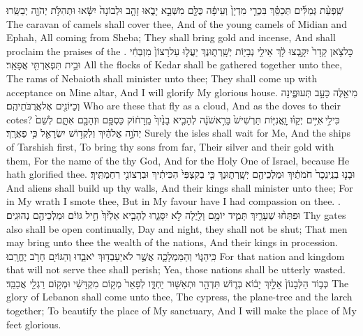 {שִֽׁפְעַ֨ת גְּמַלִּ֜ים תְּכַסֵּ֗ךְ בִּכְרֵ֤י מִדְיָן֙ וְעֵיפָ֔ה כֻּלָּ֖ם מִשְּׁבָ֣א יָבֹ֑אוּ זָהָ֤ב וּלְבוֹנָה֙ יִשָּׂ֔אוּ וּתְהִלֹּ֥ת יְהֹוָ֖ה יְבַשֵּֽׂרוּ׃}
{The caravan of camels shall cover thee, And of the young camels of Midian and Ephah, All coming from Sheba; They shall bring gold and incense, And shall proclaim the praises of the \lord.}
{כׇּל\maqqaf צֹ֤אן קֵדָר֙ יִקָּ֣בְצוּ לָ֔ךְ אֵילֵ֥י נְבָי֖וֹת יְשָֽׁרְת֑וּנֶךְ יַעֲל֤וּ עַל\maqqaf רָצוֹן֙ מִזְבְּחִ֔י וּבֵ֥ית תִּפְאַרְתִּ֖י אֲפָאֵֽר׃}
{All the flocks of Kedar shall be gathered together unto thee, The rams of Nebaioth shall minister unto thee; They shall come up with acceptance on Mine altar, And I will glorify My glorious house.}
{מִי\maqqaf אֵ֖לֶּה כָּעָ֣ב תְּעוּפֶ֑ינָה וְכַיּוֹנִ֖ים אֶל\maqqaf אֲרֻבֹּתֵיהֶֽם׃}
{Who are these that fly as a cloud, And as the doves to their cotes?}
{כִּי\maqqaf לִ֣י \legarmeh  אִיִּ֣ים יְקַוּ֗וּ וׇֽאֳנִיּ֤וֹת תַּרְשִׁישׁ֙ בָּרִ֣אשֹׁנָ֔ה לְהָבִ֤יא בָנַ֙יִךְ֙ מֵֽרָח֔וֹק כַּסְפָּ֥ם וּזְהָבָ֖ם אִתָּ֑ם לְשֵׁם֙ יְהֹוָ֣ה אֱלֹהַ֔יִךְ וְלִקְד֥וֹשׁ יִשְׂרָאֵ֖ל כִּ֥י פֵאֲרָֽךְ׃}
{Surely the isles shall wait for Me, And the ships of Tarshish first, To bring thy sons from far, Their silver and their gold with them, For the name of the \lord\space thy God, And for the Holy One of Israel, because He hath glorified thee.}
{וּבָנ֤וּ בְנֵֽי\maqqaf נֵכָר֙ חֹמֹתַ֔יִךְ וּמַלְכֵיהֶ֖ם יְשָֽׁרְת֑וּנֶךְ כִּ֤י בְקִצְפִּי֙ הִכִּיתִ֔יךְ וּבִרְצוֹנִ֖י רִחַמְתִּֽיךְ׃}
{And aliens shall build up thy walls, And their kings shall minister unto thee; For in My wrath I smote thee, But in My favour have I had compassion on thee. .}
{וּפִתְּח֨וּ שְׁעָרַ֧יִךְ תָּמִ֛יד יוֹמָ֥ם וָלַ֖יְלָה לֹ֣א יִסָּגֵ֑רוּ לְהָבִ֤יא אֵלַ֙יִךְ֙ חֵ֣יל גּוֹיִ֔ם וּמַלְכֵיהֶ֖ם נְהוּגִֽים׃}
{Thy gates also shall be open continually, Day and night, they shall not be shut; That men may bring unto thee the wealth of the nations, And their kings in procession.}
{כִּֽי\maqqaf הַגּ֧וֹי וְהַמַּמְלָכָ֛ה אֲשֶׁ֥ר לֹא\maqqaf יַעַבְד֖וּךְ יֹאבֵ֑דוּ וְהַגּוֹיִ֖ם חָרֹ֥ב יֶחֱרָֽבוּ׃}
{For that nation and kingdom that will not serve thee shall perish; Yea, those nations shall be utterly wasted.}
{כְּב֤וֹד הַלְּבָנוֹן֙ אֵלַ֣יִךְ יָב֔וֹא בְּר֛וֹשׁ תִּדְהָ֥ר וּתְאַשּׁ֖וּר יַחְדָּ֑ו לְפָאֵר֙ מְק֣וֹם מִקְדָּשִׁ֔י וּמְק֥וֹם רַגְלַ֖י אֲכַבֵּֽד׃}
{The glory of Lebanon shall come unto thee, The cypress, the plane-tree and the larch together; To beautify the place of My sanctuary, And I will make the place of My feet glorious.}

